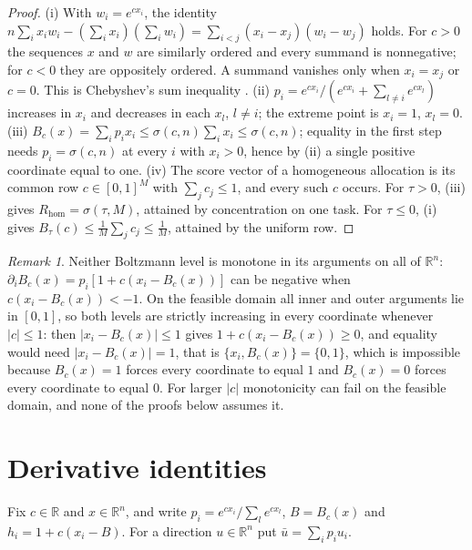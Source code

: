 \documentclass[11pt]{article}
\theoremstyle{plain}
\theoremstyle{definition}
\theoremstyle{remark}
\newtheorem{remark}[theorem]{Remark}
\newcommand{\R}{\mathbb{R}}
\newcommand{\Rhom}{R_{\mathrm{hom}}}
\newcommand{\sig}{\sigma}
\begin{document}
\begin{proof}
(i) With $w_i=e^{cx_i}$, the identity $n\sum_ix_iw_i-(\sum_ix_i)(\sum_iw_i)=\sum_{i<j}(x_i-x_j)(w_i-w_j)$ holds. For $c>0$ the sequences $x$ and $w$ are similarly ordered and every summand is nonnegative; for $c<0$ they are oppositely ordered. A summand vanishes only when $x_i=x_j$ or $c=0$. This is Chebyshev's sum inequality \cite[\S2.17]{HLP}.
(ii) $p_i=e^{cx_i}/(e^{cx_i}+\sum_{l\ne i}e^{cx_l})$ increases in $x_i$ and decreases in each $x_l$, $l\ne i$; the extreme point is $x_i=1$, $x_l=0$.
(iii) $B_c(x)=\sum_ip_ix_i\le\sig(c,n)\sum_ix_i\le\sig(c,n)$; equality in the first step needs $p_i=\sig(c,n)$ at every $i$ with $x_i>0$, hence by (ii) a single positive coordinate equal to one.
(iv) The score vector of a homogeneous allocation is its common row $c\in[0,1]^M$ with $\sum_jc_j\le1$, and every such $c$ occurs. For $\tau>0$, (iii) gives $\Rhom=\sig(\tau,M)$, attained by concentration on one task. For $\tau\le0$, (i) gives $B_\tau(c)\le\frac1M\sum_jc_j\le\frac1M$, attained by the uniform row.
\end{proof}

\begin{remark}
Neither Boltzmann level is monotone in its arguments on all of $\R^n$: $\partial_iB_c(x)=p_i[1+c(x_i-B_c(x))]$ can be negative when $c(x_i-B_c(x))<-1$. On the feasible domain all inner and outer arguments lie in $[0,1]$, so both levels are strictly increasing in every coordinate whenever $|c|\le1$: then $|x_i-B_c(x)|\le1$ gives $1+c(x_i-B_c(x))\ge0$, and equality would need $|x_i-B_c(x)|=1$, that is $\{x_i,B_c(x)\}=\{0,1\}$, which is impossible because $B_c(x)=1$ forces every coordinate to equal $1$ and $B_c(x)=0$ forces every coordinate to equal $0$. For larger $|c|$ monotonicity can fail on the feasible domain, and none of the proofs below assumes it.
\end{remark}

\section{Derivative identities}\label{sec:derivatives}

Fix $c\in\R$ and $x\in\R^n$, and write $p_i=e^{cx_i}/\sum_le^{cx_l}$, $B=B_c(x)$ and $h_i=1+c(x_i-B)$. For a direction $u\in\R^n$ put $\bar u=\sum_ip_iu_i$.
\end{document}
